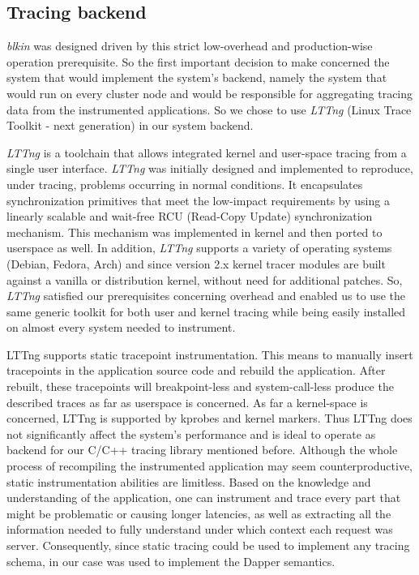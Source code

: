 \documentclass[a4paper,10pt,twocolumn]{article}
\begin{document}
\subsection{Tracing backend} \emph{blkin} was designed driven by this strict
low-overhead and production-wise operation  prerequisite. So the first important
decision to make concerned the system that would implement the system's backend,
namely the system that would run on every cluster node and would be responsible
for aggregating tracing data from the instrumented applications. So we chose to
use \emph{LTTng} (Linux Trace Toolkit - next generation)\cite{lttng} in our
system backend.

\emph{LTTng} is a toolchain that allows integrated kernel and user-space tracing
from a single user interface. \emph{LTTng} was initially designed and
implemented to reproduce, under tracing, problems occurring in normal
conditions. It encapsulates synchronization primitives that meet the low-impact
requirements by using a linearly scalable and wait-free RCU (Read-Copy Update)
synchronization mechanism. This mechanism was implemented in kernel and then
ported to userspace as well. In addition, \emph{LTTng} supports a variety of
operating systems (Debian, Fedora, Arch) and since version 2.x kernel tracer
modules are built against a vanilla or distribution kernel, without need for
additional patches.  So, \emph{LTTng} satisfied our prerequisites concerning
overhead and enabled us to use the same generic toolkit for both user and kernel
tracing while being easily installed on almost every system needed to
instrument. 

LTTng supports static tracepoint instrumentation. This means to manually insert
tracepoints in the application source code and rebuild the application. After
rebuilt, these tracepoints will breakpoint-less and system-call-less produce the
described traces as far as userspace is concerned. As far a kernel-space is
concerned, LTTng is supported by kprobes and kernel markers. Thus LTTng does not
significantly affect the system's performance and is ideal to operate as backend
for our C/C++ tracing library mentioned before.  Although the whole process of
recompiling the instrumented application  may seem counterproductive, static
instrumentation abilities are limitless. Based on the knowledge and
understanding of the application, one can instrument and trace every part that
might be problematic or causing longer latencies, as well as extracting all the
information needed to fully understand under which context each request was
server.  Consequently, since static tracing could be used to implement any
tracing schema, in our case was used to implement the Dapper semantics.
\end{document}
